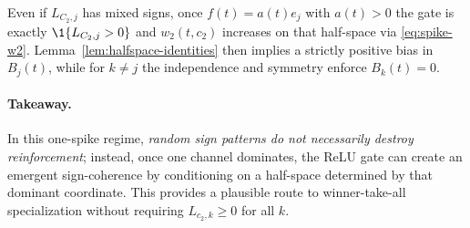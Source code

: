\begin{remark}
Even if $L_{C_2,j}$ has mixed signs, once $f(t)=a(t)e_j$ with $a(t)>0$ the gate is exactly $\1\{L_{C_2,j}>0\}$ and $w_2(t,c_2)$ increases on that half-space via \eqref{eq:spike-w2}.
Lemma~\ref{lem:halfspace-identities} then implies a strictly positive bias in $B_j(t)$, while for $k\neq j$ the independence and symmetry enforce $B_k(t)=0$.
\end{remark}

\paragraph{Takeaway.}
In this one-spike regime, \emph{random sign patterns do not necessarily destroy reinforcement}; instead, once one channel dominates, the ReLU gate can create an emergent sign-coherence by conditioning on a half-space determined by that dominant coordinate.
This provides a plausible route to winner-take-all specialization without requiring $L_{c_2,k}\ge 0$ for all $k$.

